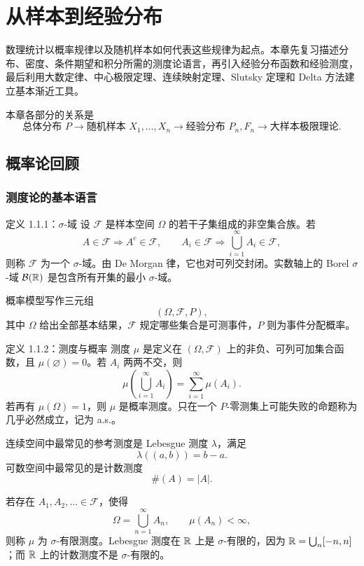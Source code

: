 \chapter{从样本到经验分布}

数理统计以概率规律以及随机样本如何代表这些规律为起点。本章先复习描述分布、密度、条件期望和积分所需的测度论语言，再引入经验分布函数和经验测度，最后利用大数定律、中心极限定理、连续映射定理、Slutsky 定理和 Delta 方法建立基本渐近工具。

本章各部分的关系是
\[
  \text{总体分布 }P
  \longrightarrow
  \text{随机样本 }X_1,\ldots,X_n
  \longrightarrow
  \text{经验分布 }P_n,F_n
  \longrightarrow
  \text{大样本极限理论}.
\]

\section{概率论回顾}

\subsection{测度论的基本语言}

\begin{definitionbox}{定义 1.1.1：$\sigma$-域}
设 $\mathcal F$ 是样本空间 $\Omega$ 的若干子集组成的非空集合族。若
\[
 A\in\mathcal F\Rightarrow A^c\in\mathcal F,
 \qquad
 A_i\in\mathcal F\Rightarrow \bigcup_{i=1}^{\infty}A_i\in\mathcal F,
\]
则称 $\mathcal F$ 为一个 $\sigma$-域。由 De Morgan 律，它也对可列交封闭。实数轴上的 Borel $\sigma$-域 $\mathcal B(\mathbb R)$ 是包含所有开集的最小 $\sigma$-域。
\end{definitionbox}

概率模型写作三元组
\[
  (\Omega,\mathcal F,P),
\]
其中 $\Omega$ 给出全部基本结果，$\mathcal F$ 规定哪些集合是可测事件，$P$ 则为事件分配概率。

\begin{definitionbox}{定义 1.1.2：测度与概率}
测度 $\mu$ 是定义在 $(\Omega,\mathcal F)$ 上的非负、可列可加集合函数，且 $\mu(\varnothing)=0$。若 $A_i$ 两两不交，则
\[
 \mu\!\left(\bigcup_{i=1}^{\infty}A_i\right)
 =\sum_{i=1}^{\infty}\mu(A_i).
\]
若再有 $\mu(\Omega)=1$，则 $\mu$ 是概率测度。只在一个 $P$-零测集上可能失败的命题称为几乎必然成立，记为 a.s.。
\end{definitionbox}

连续空间中最常见的参考测度是 Lebesgue 测度 $\lambda$，满足
\[
 \lambda((a,b))=b-a.
\]
可数空间中最常见的是计数测度
\[
 \#(A)=|A|.
\]

若存在 $A_1,A_2,\ldots\in\mathcal F$，使得
\[
 \Omega=\bigcup_{n=1}^{\infty}A_n,
 \qquad \mu(A_n)<\infty,
\]
则称 $\mu$ 为 $\sigma$-有限测度。Lebesgue 测度在 $\mathbb R$ 上是 $\sigma$-有限的，因为 $\mathbb R=\bigcup_n[-n,n]$；而 $\mathbb R$ 上的计数测度不是 $\sigma$-有限的。

